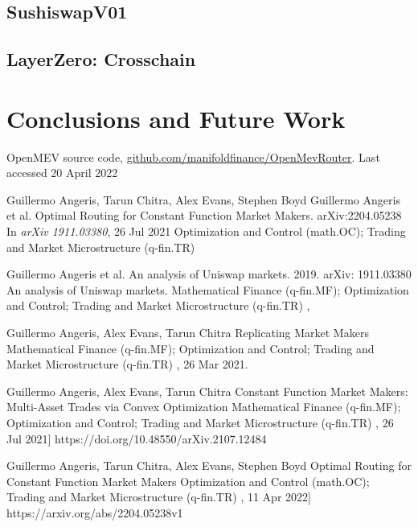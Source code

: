 \documentclass[runningheads]{llncs}
\begin{document}
\subsection{SushiswapV01}

\subsection{LayerZero: Crosschain}

\section{Conclusions and Future Work}

\newpage
%
%
%
% 
% 
%
\begin{thebibliography}{1}
OpenMEV source code, \url{github.com/manifoldfinance/OpenMevRouter}.
Last accessed 20 April 2022
	
\newline 
{}
Guillermo Angeris, Tarun Chitra, Alex Evans, Stephen Boyd
\newblock Guillermo Angeris et al. Optimal Routing for Constant Function Market Makers.	arXiv:2204.05238
\newblock In {\em arXiv 1911.03380}, 26 Jul 2021
    Optimization and Control (math.OC); Trading and Market Microstructure (q-fin.TR)

\hfill \break
{}
Guillermo Angeris et al. An analysis of Uniswap markets. 2019. arXiv: 1911.03380
\newblock An analysis of Uniswap markets.
Mathematical Finance (q-fin.MF); Optimization and Control; Trading and Market Microstructure (q-fin.TR)
, 

\hfill \break
{}
Guillermo Angeris, Alex Evans, Tarun Chitra
\newblock Replicating Market Makers
Mathematical Finance (q-fin.MF); Optimization and Control; Trading and Market Microstructure (q-fin.TR)
, 26 Mar 2021.

\hfill \break
{}
Guillermo Angeris, Alex Evans, Tarun Chitra
\newblock Constant Function Market Makers: Multi-Asset Trades via Convex Optimization
Mathematical Finance (q-fin.MF); Optimization and Control; Trading and Market Microstructure (q-fin.TR)
, 26 Jul 2021]
https://doi.org/10.48550/arXiv.2107.12484

\hfill \break
{}
Guillermo Angeris, Tarun Chitra, Alex Evans, Stephen Boyd
\newblock Optimal Routing for Constant Function Market Makers
Optimization and Control (math.OC); Trading and Market Microstructure (q-fin.TR)
, 11 Apr 2022]
https://arxiv.org/abs/2204.05238v1
\hfill \break

\end{thebibliography}
\end{document}
